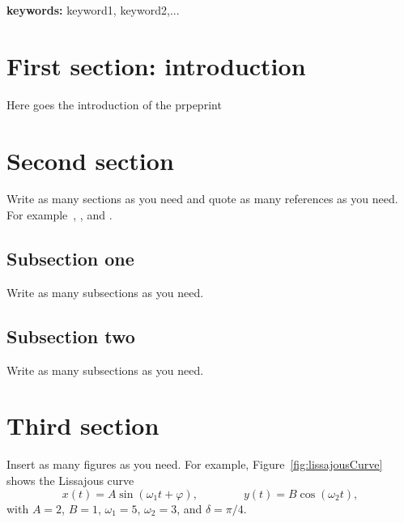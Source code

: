 \documentclass[10pt,twoside]{article}
\theoremstyle{remark}
\theoremstyle{definition}
\begin{document}
\textbf{keywords:} keyword1, keyword2,...

\tableofcontents

\section{First section: introduction}\label{sec:1stSection}
\noindent Here goes the introduction of the prpeprint

\section{Second section}\label{sec:2ndSection}
\noindent Write as many sections as you need and quote as many references as you
need. For example~\cite{GoossensMS94}, \cite{KernighanR88}, and
\cite{Stroustrup97}. 

\subsection{Subsection one}\label{sec:1stSubsectionOf1stSection}
\noindent Write as many subsections as you need.

\subsection{Subsection two}\label{sec:2ndSubsectionOf2ndSection}
\noindent Write as many subsections as you need.

\section{Third section}\label{sec:3rdSection}
\noindent Insert as many figures as you need. For example,
Figure~\ref{fig:lissajousCurve} shows the Lissajous curve
\begin{equation}\label{eq:lissajousCurve}
	x(t) = A\sin(\omega_{1} t + \varphi),\qquad\qquad
	y(t) = B\cos(\omega_{2} t),
\end{equation}
with $A = 2$, $B = 1$, $\omega_{1} = 5$, $\omega_{2} = 3$, and $\delta = \pi/4$.
\end{document}
